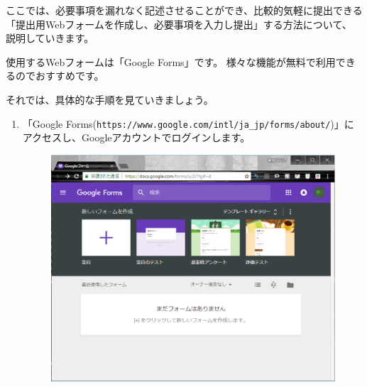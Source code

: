 \documentclass[11pt,a4paper]{jsarticle}
\begin{document}
            ここでは、必要事項を漏れなく記述させることができ、比較的気軽に提出できる「提出用Webフォームを作成し、必要事項を入力し提出」する方法について、
            説明していきます。

            使用するWebフォームは「Google Forms」です。
            様々な機能が無料で利用できるのでおすすめです。

            それでは、具体的な手順を見ていきましょう。
            \begin{enumerate}
                \item 「Google Forms(\texttt{https://www.google.com/intl/ja\_jp/forms/about/})」にアクセスし、Googleアカウントでログインします。
                        \begin{figure}[htbp]
                            \begin{center}
                            \includegraphics[width=12.0cm]{./form01.eps}
                            \label{fig:form01}
                            \end{center}
                        \end{figure}


\end{enumerate}
\end{document}
